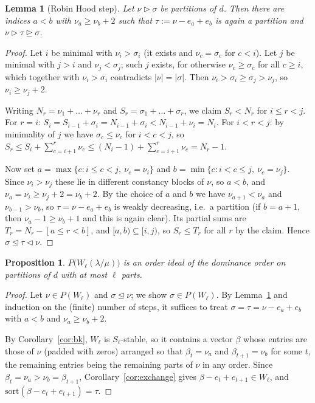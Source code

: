 \documentclass[11pt]{article}
\theoremstyle{plain}
\newtheorem{lem}[thm]{Lemma}
\newtheorem{prop}[thm]{Proposition}
\theoremstyle{definition}
\begin{document}
\begin{lem}[Robin Hood step]\label{lem:hlp}
Let $\nu\rhd\sigma$ be partitions of $d$. Then there are indices $a<b$ with
$\nu_a\ge\nu_b+2$ such that $\tau:=\nu-e_a+e_b$ is again a partition and
$\nu\rhd\tau\trianglerighteq\sigma$.
\end{lem}

\begin{proof}
Let $i$ be minimal with $\nu_i>\sigma_i$ (it exists and $\nu_c=\sigma_c$ for $c<i$). Let $j$ be
minimal with $j>i$ and $\nu_j<\sigma_j$; such $j$ exists, for otherwise $\nu_c\ge\sigma_c$ for
all $c\ge i$, which together with $\nu_i>\sigma_i$ contradicts $|\nu|=|\sigma|$. Then
$\nu_i>\sigma_i\ge\sigma_j>\nu_j$, so $\nu_i\ge\nu_j+2$.

Writing $N_r=\nu_1+\dots+\nu_r$ and $S_r=\sigma_1+\dots+\sigma_r$, we claim $S_r<N_r$ for
$i\le r<j$. For $r=i$: $S_i=S_{i-1}+\sigma_i=N_{i-1}+\sigma_i<N_{i-1}+\nu_i=N_i$. For
$i<r<j$: by minimality of $j$ we have $\sigma_c\le\nu_c$ for $i<c<j$, so
$S_r\le S_i+\sum_{c=i+1}^{r}\nu_c\le (N_i-1)+\sum_{c=i+1}^{r}\nu_c=N_r-1$.

Now set $a=\max\{c: i\le c<j,\ \nu_c=\nu_i\}$ and $b=\min\{c: i<c\le j,\ \nu_c=\nu_j\}$. Since
$\nu_i>\nu_j$ these lie in different constancy blocks of $\nu$, so $a<b$, and
$\nu_a=\nu_i\ge\nu_j+2=\nu_b+2$. By the choice of $a$ and $b$ we have $\nu_{a+1}<\nu_a$ and
$\nu_{b-1}>\nu_b$, so $\tau=\nu-e_a+e_b$ is weakly decreasing, i.e.\ a partition (if $b=a+1$,
then $\nu_a-1\ge\nu_b+1$ and this is again clear). Its partial sums are $T_r=N_r-[a\le r<b]$,
and $[a,b)\subseteq[i,j)$, so $S_r\le T_r$ for all $r$ by the claim. Hence
$\sigma\trianglelefteq\tau\lhd\nu$.
\end{proof}

\begin{prop}\label{prop:ideal}
$P\bigl(W_\ell(\lambda/\mu)\bigr)$ is an order ideal of the dominance order on partitions of
$d$ with at most $\ell$ parts.
\end{prop}

\begin{proof}
Let $\nu\in P(W_\ell)$ and $\sigma\trianglelefteq\nu$; we show $\sigma\in P(W_\ell)$. By
Lemma~\ref{lem:hlp} and induction on the (finite) number of steps, it suffices to treat
$\sigma=\tau=\nu-e_a+e_b$ with $a<b$ and $\nu_a\ge\nu_b+2$.

By Corollary~\ref{cor:bk}, $W_\ell$ is $S_\ell$-stable, so it contains a vector $\beta$ whose
entries are those of $\nu$ (padded with zeros) arranged so that $\beta_t=\nu_a$ and
$\beta_{t+1}=\nu_b$ for some $t$, the remaining entries being the remaining parts of $\nu$ in
any order. Since $\beta_t=\nu_a>\nu_b=\beta_{t+1}$, Corollary~\ref{cor:exchange} gives
$\beta-e_t+e_{t+1}\in W_\ell$, and $\mathrm{sort}(\beta-e_t+e_{t+1})=\tau$.
\end{proof}
\end{document}
